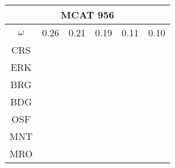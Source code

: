 \documentclass[a4paper,12pt]{article}
\begin{document}
\begin{tabular}{|c|c|c|c|c|c|}%
         \hline \multicolumn{6}{|c|}{MCAT 956} \\ \hline
         $\omega$&0.26&0.21&0.19&0.11&0.10\\ \hline %
        CRS&\cellcolor[HTML]{E41A1C}&\cellcolor[HTML]{E41A1C}&\cellcolor[HTML]{E41A1C}&\cellcolor[HTML]{E41A1C}&\cellcolor[HTML]{E41A1C}\\ \hline %
        ERK&\cellcolor[HTML]{E41A1C}&\cellcolor[HTML]{377EB8}&\cellcolor[HTML]{E41A1C}&\cellcolor[HTML]{377EB8}&\cellcolor[HTML]{E41A1C}\\ \hline %
        BRG&\cellcolor[HTML]{377EB8}&\cellcolor[HTML]{4DAF4A}&\cellcolor[HTML]{377EB8}&\cellcolor[HTML]{4DAF4A}&\cellcolor[HTML]{377EB8}\\ \hline %
        BDG&\cellcolor[HTML]{377EB8}&\cellcolor[HTML]{4DAF4A}&\cellcolor[HTML]{377EB8}&\cellcolor[HTML]{4DAF4A}&\cellcolor[HTML]{377EB8}\\ \hline %
        OSF&\cellcolor[HTML]{4DAF4A}&\cellcolor[HTML]{4DAF4A}&\cellcolor[HTML]{377EB8}&\cellcolor[HTML]{4DAF4A}&\cellcolor[HTML]{377EB8}\\ \hline %
        MNT&\cellcolor[HTML]{4DAF4A}&\cellcolor[HTML]{984EA3}&\cellcolor[HTML]{4DAF4A}&\cellcolor[HTML]{984EA3}&\cellcolor[HTML]{4DAF4A}\\ \hline %
        MRO&\cellcolor[HTML]{4DAF4A}&\cellcolor[HTML]{984EA3}&\cellcolor[HTML]{4DAF4A}&\cellcolor[HTML]{984EA3}&\cellcolor[HTML]{4DAF4A}\\ \hline %

\end{tabular}
\end{document}
